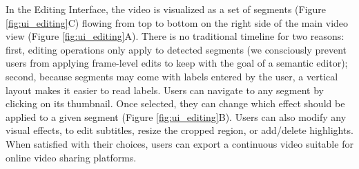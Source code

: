 In the Editing Interface, the video is visualized as a set of segments (Figure \ref{fig:ui_editing}C) flowing from top to bottom on the right side of the main video view (Figure \ref{fig:ui_editing}A). There is no traditional timeline for two reasons: first, editing operations only apply to detected segments (we consciously prevent users from applying frame-level edits to keep with the goal of a semantic editor); second, because segments may come with labels entered by the user, a vertical layout makes it easier to read labels. Users can navigate to any segment by clicking on its thumbnail. Once selected, they can change which effect should be applied to a given segment (Figure \ref{fig:ui_editing}B). Users can also modify any visual effects, to edit subtitles, resize the cropped region, or add/delete highlights. When satisfied with their choices, users can export a continuous video suitable for online video sharing platforms.




